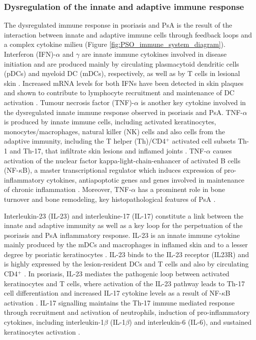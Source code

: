 \subsubsection*{Dysregulation of the innate and adaptive immune response}
The dysregulated immune response in psoriasis and PsA is the result of the interaction between innate and adaptive immune cells through feedback loops and a complex cytokine milieu (Figure \ref{fig:PSO_immune_system_diagram}). Interferon (IFN)-$\alpha$ and $\gamma$ are innate immune cytokines involved in disease initiation and are produced mainly by circulating plasmacytoid dendritic cells (pDCs) and myeloid DC (mDCs), respectively, as well as by T cells in lesional skin \parencite{Johnson-Huang2009,Perera2012,Hijnen2013}. Increased mRNA levels for both IFNs have been detected in skin plaques and shown to contribute to lymphocyte recruitment and maintenance of DC activation \parencite{Schmid1994}. Tumour necrosis factor (TNF)-$\alpha$ is another key cytokine involved in the dysregulated innate immune response observed in psoriasis and PsA. TNF-$\alpha$ is produced by innate immune cells, including activated keratinocytes, monocytes/macrophages, natural killer (NK) cells
 and also cells from the adaptive immunity, including the T helper (Th)/CD4$^+$ activated cell subsets Th-1 and Th-17, that infiltrate skin lesions and inflamed joints \parencite{Perera2012,Lizzul2005}. TNF-$\alpha$ causes activation of the nuclear factor kappa-light-chain-enhancer of activated B cells (NF-$\kappa$B), a master transcriptional regulator which induces expression of pro-inflammatory cytokines, antiapoptotic genes and genes involved in maintenance of chronic inflammation \parencite{Lizzul2005, Johansen2004}. Moreover, TNF-$\alpha$ has a prominent role in bone turnover and bone remodeling, key histopathological features of PsA \parencite{Mensah2008}. 

Interleukin-23 (IL-23) and interleukine-17 (IL-17) constitute a link between the innate and adaptive immunity as well as a key loop for the perpetuation of the psoriasis and PsA inflammatory response. IL-23 is an innate immune cytokine mainly produced by the mDCs and macrophages in inflamed skin and to a lesser degree by psoriatic keratinocytes \parencite{Lee2004, Li2018}. IL-23 binds to the IL-23 receptor (IL23R) and is highly expressed by the lesion-resident DCs and T cells and also by circulating CD4$^+$ \parencite{Tonel2010}. In psoriasis, IL-23 mediates the pathogenic loop between activated keratinocytes and T cells, where activation of the IL-23 pathway leads to Th-17 cell differentiation and increased IL-17 cytokine levels as a result of NF-$\kappa$B activation \parencite{McGeachy2009}. %
IL-17 signalling maintains the Th-17 immune mediated response through recruitment and activation of neutrophils, induction of pro-inflammatory cytokines, including interleukin-1$\beta$ (IL-1$\beta$) and interleukin-6 (IL-6), and sustained keratinocytes activation \parencite{Doyle2012}.


